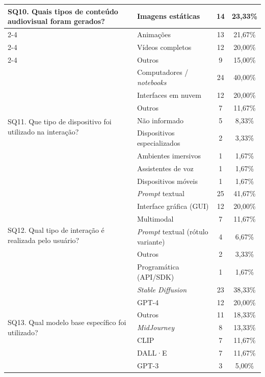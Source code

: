 \begin{longtable}{|p{4.2cm}|p{5.2cm}|c|c|}
\multirow{4}{=}{SQ10. Quais tipos de conteúdo audiovisual foram gerados?}
& Imagens estáticas & 14 & 23,33\% \\ \cline{2-4}
& Animações & 13 & 21,67\% \\ \cline{2-4}
& Vídeos completos & 12 & 20,00\% \\ \cline{2-4}
& Outros & 9 & 15,00\% \\
\hline

\multirow{8}{=}{SQ11. Que tipo de dispositivo foi utilizado na interação?}
& Computadores / \textit{notebooks} & 24 & 40,00\% \\ \cline{2-4}
& Interfaces em nuvem & 12 & 20,00\% \\ \cline{2-4}
& Outros & 7 & 11,67\% \\ \cline{2-4}
& Não informado & 5 & 8,33\% \\ \cline{2-4}
& Dispositivos especializados & 2 & 3,33\% \\ \cline{2-4}
& Ambientes imersivos & 1 & 1,67\% \\ \cline{2-4}
& Assistentes de voz & 1 & 1,67\% \\ \cline{2-4}
& Dispositivos móveis & 1 & 1,67\% \\
\hline

\multirow{6}{=}{SQ12. Qual tipo de interação é realizada pelo usuário?}
& \textit{Prompt} textual & 25 & 41,67\% \\ \cline{2-4}
& Interface gráfica (GUI) & 12 & 20,00\% \\ \cline{2-4}
& Multimodal & 7 & 11,67\% \\ \cline{2-4}
& \textit{Prompt} textual (rótulo variante) & 4 & 6,67\% \\ \cline{2-4}
& Outros & 2 & 3,33\% \\ \cline{2-4}
& Programática (API/SDK) & 1 & 1,67\% \\
\hline

\multirow{7}{=}{SQ13. Qual modelo base específico foi utilizado?}
& \textit{Stable Diffusion} & 23 & 38,33\% \\ \cline{2-4}
& GPT-4 & 12 & 20,00\% \\ \cline{2-4}
& Outros & 11 & 18,33\% \\ \cline{2-4}
& \textit{MidJourney} & 8 & 13,33\% \\ \cline{2-4}
& CLIP & 7 & 11,67\% \\ \cline{2-4}
& DALL·E & 7 & 11,67\% \\ \cline{2-4}
& GPT-3 & 3 & 5,00\% \\
\hline


\end{longtable}
